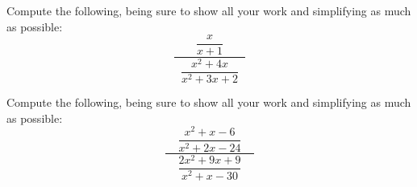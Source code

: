 \documentclass[11pt,letterpaper]{article}
\begin{document}
\newpage





 Compute the following, being sure to show all your work and simplifying as much as possible:
	\[
	\dfrac{\phantom{.}\;\;\;\;\;\;\dfrac{x}{x + 1}\;\;\;\;\;\;\phantom{.}}{\dfrac{x^2 + 4x}{x^2 + 3x + 2}}
	\]





\newpage





 Compute the following, being sure to show all your work and simplifying as much as possible:
	\[
	\dfrac{\phantom{.}\;\;\;\dfrac{x^2 + x - 6}{x^2 + 2x - 24}\;\;\;\phantom{.}}{\dfrac{2x^2 + 9x + 9}{x^2 + x - 30}}
	\]





\end{document}
